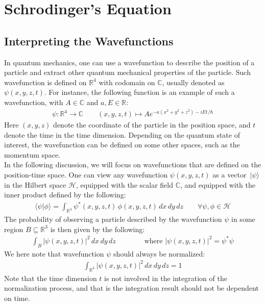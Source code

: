\documentclass[11pt]{book}
\theoremstyle{break}
\theoremstyle{break}
\newcommand{\R}{\mathbb{R}}
\newcommand{\C}{\mathbb{C}}
\newcommand{\ket}[1]{\,| #1 \rangle}
\begin{document}
\newpage
\chapter{Schrodinger's Equation}
\section[Interpreting the Wavefunctions]{\color{red}Interpreting the Wavefunctions\color{black}}
In quantum mechanics, one can use a wavefunction to describe the position of a particle and extract other quantum mechanical properties of the particle. Such wavefunction is defined on $\R^4$ with codomain on $\C$, usually denoted as $\psi(x,y,z,t)$. For instance, the following function is an example of such a wavefunction, with $A\in \C$ and $a,E \in \R$:
\begin{align*}
\psi: \R^4 \to \C \qquad (x,y,z,t)\mapsto Ae^{-a(x^2+y^2+z^2) - iEt/\hbar}
\end{align*}
Here $(x,y,z)$ denote the coordinate of the particle in the position space, and $t$ denote the time in the time dimension. Depending on the quantum state of interest, the wavefunction can be defined on some other spaces, such as the momentum space.\\


In the following discussion, we will focus on wavefunctions that are defined on the position-time space. One can view any wavefunction $\psi(x,y,z,t)$ as a vector $\ket{\psi}$ in the Hilbert space $\mathcal{H}$, equipped with the scalar field $\C$, and equipped with the inner product defined by the following:
\begin{align*}
\langle \psi | \phi\rangle = \int_{\R^3} \psi^*(x,y,z,t)\, \phi(x,y,z,t) \, dx\, dy\, dz\qquad \forall	 \psi, \phi \in \mathcal{H}
\end{align*}
The probability of observing a particle described by the wavefunction $\psi$ in some region $B \subseteq \R^3$ is then given by the following:
\begin{align*}
\int_{B} |\psi(x,y,z,t)|^2\, dx\, dy\, dz\qquad\qquad \text{where }|\psi(x,y,z,t)|^2 = \psi^*\psi
\end{align*}
We here note that wavefunction $\psi$ should always be normalized:
\begin{align*}
\int_{\R^3} |\psi(x,y,z,t)|^2 \, dx\, dy\, dz = 1
\end{align*}
Note that the time dimension $t$ is not involved in the integration of the normalization process, and that is the integration result should not be dependent on time.\\
\end{document}
